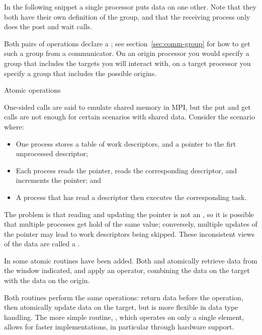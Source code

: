 In the following snippet a single processor puts data on one
other. Note that they both have their own definition of the group, and
that the receiving process only does the post and wait calls.
%

Both pairs of operations declare a
; see section~\ref{sec:comm-group}
for how to get such a group from a communicator.
On an origin processor you would specify a group that includes the targets
you will interact with, on a target processor you specify a group
that includes the possible origins.

 {Atomic operations}
\label{sec:mpi-atomic}

One-sided calls are said to emulate shared memory in MPI, but 
the put and get calls are not enough for certain scenarios with shared
data. Consider the scenario where:
\begin{itemize}
\item One process stores a table of work descriptors, and a pointer to
  the firt unprocessed descriptor;
\item Each process reads the pointer, reads the corresponding
  descriptor, and increments the pointer; and
\item A process that has read a descriptor then executes the
  corresponding task.
\end{itemize}
The problem is that reading and updating the pointer is not an
, so
it is possible that multiple processes get hold of the same value;
conversely, multiple updates of the pointer may lead to work
descriptors being skipped. These inconsistent views of the data are
called a .

In  some atomic routines have been added.
Both  and 
atomically retrieve data from the window indicated,
and apply an operator, combining the data on the target
with the data on the origin.
%
%

Both routines perform the same operations: return data before the
operation, then atomically update data on the target, but
 is more flexible in data type
handling. The more simple routine, ,
which operates on only a single element,
allows for faster implementations, in particular through hardware support.

